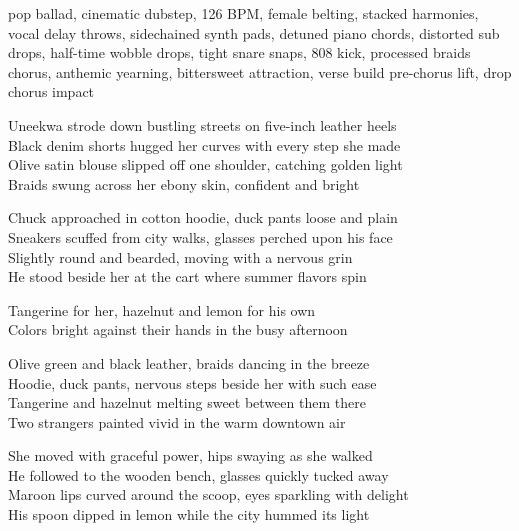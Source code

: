 

\begin{notes}
\end{notes}
\begin{style}
pop ballad, cinematic dubstep, 126 BPM, female belting, stacked harmonies, vocal delay throws, sidechained synth pads, detuned piano chords, distorted sub drops, half-time wobble drops, tight snare snaps, 808 kick, processed braids chorus, anthemic yearning, bittersweet attraction, verse build pre-chorus lift, drop chorus impact
\end{style}
\begin{lyrics}
Uneekwa strode down bustling streets on five-inch leather heels\\
Black denim shorts hugged her curves with every step she made\\
Olive satin blouse slipped off one shoulder, catching golden light\\
Braids swung across her ebony skin, confident and bright

Chuck approached in cotton hoodie, duck pants loose and plain\\
Sneakers scuffed from city walks, glasses perched upon his face\\
Slightly round and bearded, moving with a nervous grin\\
He stood beside her at the cart where summer flavors spin

Tangerine for her, hazelnut and lemon for his own\\
Colors bright against their hands in the busy afternoon

Olive green and black leather, braids dancing in the breeze\\
Hoodie, duck pants, nervous steps beside her with such ease\\
Tangerine and hazelnut melting sweet between them there\\
Two strangers painted vivid in the warm downtown air

She moved with graceful power, hips swaying as she walked\\
He followed to the wooden bench, glasses quickly tucked away\\
Maroon lips curved around the scoop, eyes sparkling with delight\\
His spoon dipped in lemon while the city hummed its light


\end{lyrics}
